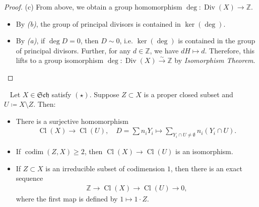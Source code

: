 \documentclass[11pt,a4paper,footinclude=true,headinclude=true]{scrbook} %
\DeclareMathOperator{\Div}{Div}
\DeclareMathOperator{\Cl}{Cl}
\DeclareMathOperator{\codim}{codim}
\newcommand{\Sch}{\mathfrak{Sch}}
\newcommand{\<}{\langle}
\newcommand{\>}{\rangle}
\newcommand{\isoto}{\overset{\sim}{\to}}
\newenvironment{proposition}[2][]
{\renewcommand\theinnercustomprop{#2}\innercustomprop[#1] 
\begin{mdframed}[backgroundcolor=gray!20]\ }
{\end{mdframed}\endinnercustomprop}
\begin{document}
\begin{proof}
    (c) From above, we obtain a group homomorphism $\deg:\Div(X)\to\mathbb{Z}$.
    \begin{itemize}
        \item By \textit{(b)}, the group of principal divisors is contained in $\ker(\deg)$.
        \item By \textit{(a)}, if $\deg D=0$, then $D\sim0$, i.e. $\ker(\deg)$ is contained in the group of principal divisors. Further, for any $d\in\mathbb{Z}$, we have $dH\mapsto d$. Therefore, this lifts to a group isomorphism $\deg:\Div(X)\isoto\mathbb{Z}$ by \textit{Isomorphism Theorem}.
    \end{itemize}
\end{proof}

\begin{proposition}{6.5}
    Let $X\in\Sch$ satisfy $(\star)$. Suppose $Z\subset X$ is a proper closed subset and $U\coloneqq X\setminus Z$. Then:
    \begin{itemize}
        \item[(a)] There is a surjective homomorphism 
        \begin{align*}
            \Cl(X)\longrightarrow\Cl(U),\quad D=\sum n_iY_i\longmapsto\sum_{Y_i\cap U\neq\emptyset}n_i(Y_i\cap U).
        \end{align*}
        \item[(b)] If $\codim(Z,X)\geq2$, then $\Cl(X)\to\Cl(U)$ is an isomorphism.
        \item[(c)] If $Z\subset X$ is an irreducible subset of codimension $1$, then there is an exact sequence 
        \begin{align*}
            \mathbb{Z}\longrightarrow\Cl(X)\longrightarrow\Cl(U)\longrightarrow0,
        \end{align*}
        where the first map is defined by $1\mapsto1\cdot Z$.
    \end{itemize}
\end{proposition}
\end{document}
